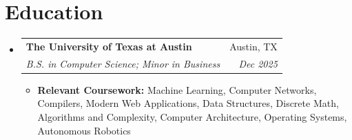 \documentclass[letterpaper,10pt]{article}
\makeatletter
\newcommand{\resumeItem}[1]{
  \item\small{
    {#1 \vspace{-3pt}}
  }
}
\newcommand{\resumeSubheading}[4]{
  \vspace{-2pt}\item
    \begin{tabular*}{0.97\textwidth}[t]{l@{\extracolsep{\fill}}r}
      \textbf{#1} & #2 \\
      \textit{\small#3} & \textit{\small #4} \\
    \end{tabular*}\vspace{-8pt}
}
\newcommand{\resumeSubHeadingListStart}{\begin{itemize}[leftmargin=0.15in, label={}]}
\newcommand{\resumeSubHeadingListEnd}{\end{itemize}}
\newcommand{\resumeItemListStart}{\begin{itemize}}
\newcommand{\resumeItemListEnd}{\end{itemize}\vspace{-6pt}}
\makeatother
\begin{document}
\section{Education}
  \resumeSubHeadingListStart
    \resumeSubheading
      {The University of Texas at Austin}{Austin, TX}
      {B.S. in Computer Science; Minor in Business}{Dec 2025}
      \resumeItemListStart
        \resumeItem{\textbf{Relevant Coursework:} Machine Learning, Computer Networks, Compilers, Modern Web Applications, Data Structures, Discrete Math, Algorithms and Complexity, Computer Architecture, Operating Systems, Autonomous Robotics}
      \resumeItemListEnd
  \resumeSubHeadingListEnd


\end{document}
